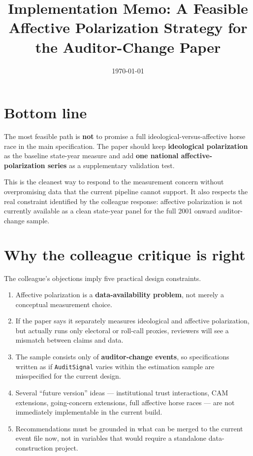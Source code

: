 \documentclass[12pt]{article}
\title{Implementation Memo: A Feasible Affective Polarization Strategy for the Auditor-Change Paper}
\author{}
\date{\today}
\begin{document}
\maketitle

\section{Bottom line}

The most feasible path is \textbf{not} to promise a full ideological-versus-affective horse race in the main specification. The paper should keep \textbf{ideological polarization} as the baseline state-year measure and add \textbf{one national affective-polarization series} as a supplementary validation test.

This is the cleanest way to respond to the measurement concern without overpromising data that the current pipeline cannot support. It also respects the real constraint identified by the colleague response: affective polarization is not currently available as a clean state-year panel for the full 2001 onward auditor-change sample.

\section{Why the colleague critique is right}

The colleague's objections imply five practical design constraints.

\begin{enumerate}[leftmargin=1.5em]
    \item Affective polarization is a \textbf{data-availability problem}, not merely a conceptual measurement choice.
    \item If the paper says it separately measures ideological and affective polarization, but actually runs only electoral or roll-call proxies, reviewers will see a mismatch between claims and data.
    \item The sample consists only of \textbf{auditor-change events}, so specifications written as if \texttt{AuditSignal} varies within the estimation sample are misspecified for the current design.
    \item Several ``future version'' ideas --- institutional trust interactions, CAM extensions, going-concern extensions, full affective horse races --- are not immediately implementable in the current build.
    \item Recommendations must be grounded in what can be merged to the current event file now, not in variables that would require a standalone data-construction project.
\end{enumerate}
\end{document}
